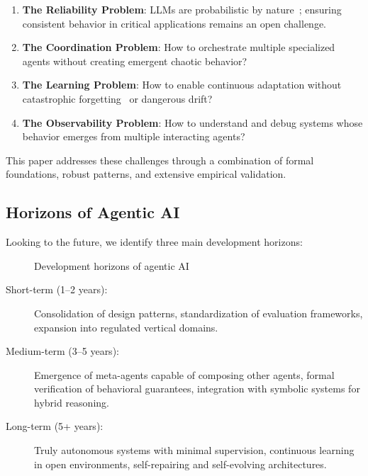 \documentclass[11pt,a4paper]{article}
\theoremstyle{definition}
\theoremstyle{remark}
\begin{document}
\begin{enumerate}
    \item \textbf{The Reliability Problem}: LLMs are probabilistic by nature~\cite{ji2023survey}; ensuring consistent behavior in critical applications remains an open challenge.

    \item \textbf{The Coordination Problem}: How to orchestrate multiple specialized agents without creating emergent chaotic behavior?

    \item \textbf{The Learning Problem}: How to enable continuous adaptation without catastrophic forgetting~\cite{kirkpatrick2017overcoming} or dangerous drift?

    \item \textbf{The Observability Problem}: How to understand and debug systems whose behavior emerges from multiple interacting agents?
\end{enumerate}

This paper addresses these challenges through a combination of formal foundations, robust patterns, and extensive empirical validation.

\subsection{Horizons of Agentic AI}

Looking to the future, we identify three main development horizons:

\begin{figure}[H]
    \centering
    
    \caption{Development horizons of agentic AI}
    \label{fig:horizons}
\end{figure}

\begin{description}
    \item[Short-term (1--2 years):] Consolidation of design patterns, standardization of evaluation frameworks, expansion into regulated vertical domains.

    \item[Medium-term (3--5 years):] Emergence of meta-agents capable of composing other agents, formal verification of behavioral guarantees, integration with symbolic systems for hybrid reasoning.

    \item[Long-term (5+ years):] Truly autonomous systems with minimal supervision, continuous learning in open environments, self-repairing and self-evolving architectures.
\end{description}
\end{document}

